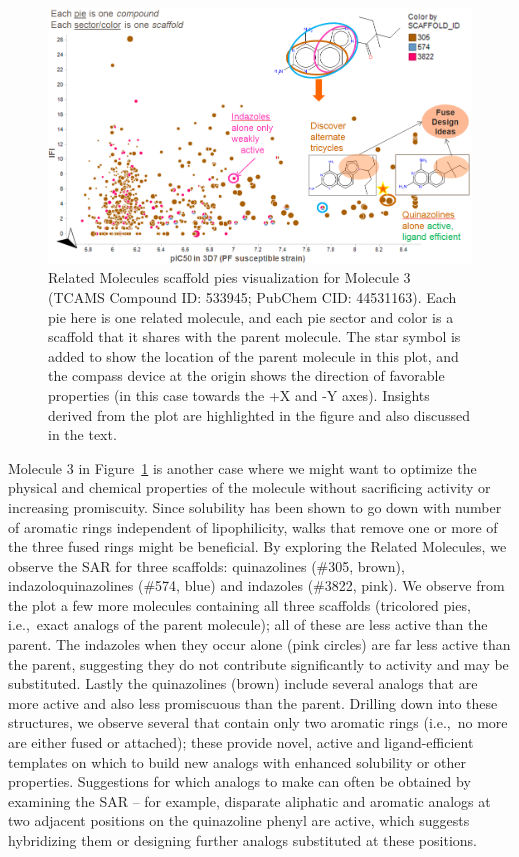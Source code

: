 \documentclass[journal=jacsat,manuscript=article]{achemso}
\newcommand*\fref[1]{Figure~\ref{fig:#1}}
\newcommand*\ie{i.e.,~}
\begin{document}
\begin{figure}
\includegraphics[width=6in]{fig/mol2_RGtool_scafpie2.png}
\caption{Related Molecules scaffold pies visualization for Molecule 3 (TCAMS Compound ID: 533945; PubChem CID: 44531163). Each pie here is one related molecule, and each pie sector and color is a scaffold that it shares with the parent molecule. The star symbol is added to show the location of the parent molecule in this plot, and the compass device at the origin shows the direction of favorable properties (in this case towards the +X and -Y axes). Insights derived from the plot are highlighted in the figure and also discussed in the text.}
\label{fig:scafwalk2}
\end{figure}

Molecule 3 in \fref{scafwalk2} is another case where we might want to optimize the physical and chemical properties of the molecule without sacrificing activity or increasing promiscuity. Since solubility has been shown to go down with number of aromatic rings independent of lipophilicity\cite{Hill2010}, walks that remove one or more of the three fused rings might be beneficial. By exploring the Related Molecules, we observe the SAR for three scaffolds: quinazolines (\#305, brown), indazoloquinazolines (\#574, blue) and indazoles (\#3822, pink). We observe from the plot a few more molecules containing all three scaffolds (tricolored pies, \ie exact analogs of the parent molecule); all of these are less active than the parent. The indazoles when they occur alone (pink circles) are far less active than the parent, suggesting they do not contribute significantly to activity and may be substituted. Lastly the quinazolines (brown) include several analogs that are more active and also less promiscuous than the parent. Drilling down into these structures, we observe several that contain only two aromatic rings (\ie no more are either fused or attached); these provide novel, active and ligand-efficient templates on which to build new analogs with enhanced solubility or other properties. Suggestions for which analogs to make can often be obtained by examining the SAR -- for example, disparate aliphatic and aromatic analogs at two adjacent positions on the quinazoline phenyl are active, which suggests hybridizing them or designing further analogs substituted at these positions.
\end{document}
